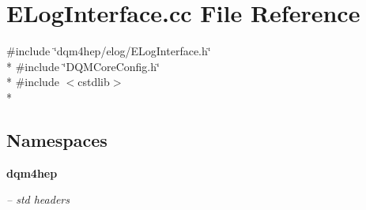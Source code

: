 \section{E\+Log\+Interface.\+cc File Reference}
\label{ELogInterface_8cc}
{\ttfamily \#include \char`\"{}dqm4hep/elog/\+E\+Log\+Interface.\+h\char`\"{}}\\*
{\ttfamily \#include \char`\"{}D\+Q\+M\+Core\+Config.\+h\char`\"{}}\\*
{\ttfamily \#include $<$cstdlib$>$}\\*
\subsection*{Namespaces}
\begin{DoxyCompactItemize}
\item 
 {\bf dqm4hep}
\begin{DoxyCompactList}\small\item\em -- std headers \end{DoxyCompactList}\end{DoxyCompactItemize}
